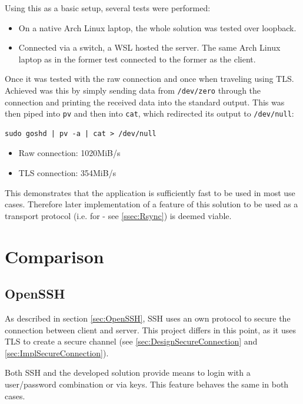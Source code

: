 \documentclass[10pt,a4paper,titlepage,twoside,english,final]{zhawreprt}
\begin{document}
Using this as a basic setup, several tests were performed:
\begin{itemize}
\item On a native Arch \gls{Linux} laptop, the whole solution was tested over \gls{loopback}.
\item Connected via a switch, a \gls{WSL} hosted the server. The same Arch \gls{Linux} laptop as in the former test connected to the former as the client.
\end{itemize}

Once it was tested with the raw connection and once when traveling using \gls{TLS}.
Achieved was this by simply sending data from \texttt{/dev/zero} through the connection and printing the received data into the standard output.
This was then piped into \texttt{pv} and then into \texttt{cat}, which redirected its output to \texttt{/dev/null}:

\setlistingBash
\begin{lstlisting}[caption={Throughput measurement},label=lst:ThroughputMeasurement]
sudo goshd | pv -a | cat > /dev/null
\end{lstlisting}

\begin{itemize}
\item Raw connection: 1020MiB/s
\item \gls{TLS} connection: 354MiB/s
\end{itemize}

This demonstrates that the application is sufficiently fast to be used in most use cases.
Therefore later implementation of a feature of this solution to be used as a transport protocol (i.e. for \cite{rsync} - see \ref{ssec:Rsync}) is deemed viable.


\section{Comparison}\label{sec:Comparison}
\subsection{OpenSSH}\label{ssec:CompOpenSSH}
As described in section \ref{sec:OpenSSH}, \gls{SSH} uses an own protocol to secure the connection between client and server.
This project differs in this point, as it uses \gls{TLS} to create a secure channel (see \ref{sec:DesignSecureConnection} and \ref{sec:ImplSecureConnection}).

Both \gls{SSH} and the developed solution provide means to login with a user/password combination or via keys.
This feature behaves the same in both cases.
\end{document}
